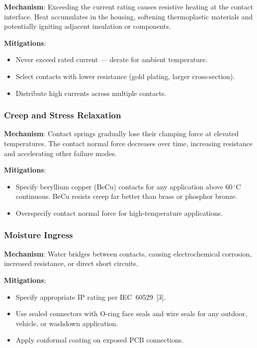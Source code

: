 \documentclass[11pt,letterpaper,twoside,openany]{book}
\newcommand{\degC}{\ensuremath{{}^{\circ}\text{C}}}
\begin{document}
\textbf{Mechanism}: Exceeding the current rating causes resistive heating at the contact interface. Heat accumulates in the housing, softening thermoplastic materials and potentially igniting adjacent insulation or components.

\textbf{Mitigations}:
\begin{itemize}[nosep,leftmargin=1.5em]
  \item Never exceed rated current --- derate for ambient temperature.
  \item Select contacts with lower resistance (gold plating, larger cross-section).
  \item Distribute high currents across multiple contacts.
\end{itemize}

\subsubsection{Creep and Stress Relaxation}

\textbf{Mechanism}: Contact springs gradually lose their clamping force at elevated temperatures. The contact normal force decreases over time, increasing resistance and accelerating other failure modes.

\textbf{Mitigations}:
\begin{itemize}[nosep,leftmargin=1.5em]
  \item Specify beryllium copper (BeCu) contacts for any application above 60\,\degC continuous. BeCu resists creep far better than brass or phosphor bronze.
  \item Overspecify contact normal force for high-temperature applications.
\end{itemize}

\subsubsection{Moisture Ingress}

\textbf{Mechanism}: Water bridges between contacts, causing electrochemical corrosion, increased resistance, or direct short circuits.

\textbf{Mitigations}:
\begin{itemize}[nosep,leftmargin=1.5em]
  \item Specify appropriate IP rating per IEC~60529~[3].
  \item Use sealed connectors with O-ring face seals and wire seals for any outdoor, vehicle, or washdown application.
  \item Apply conformal coating on exposed PCB connections.
\end{itemize}
\end{document}
